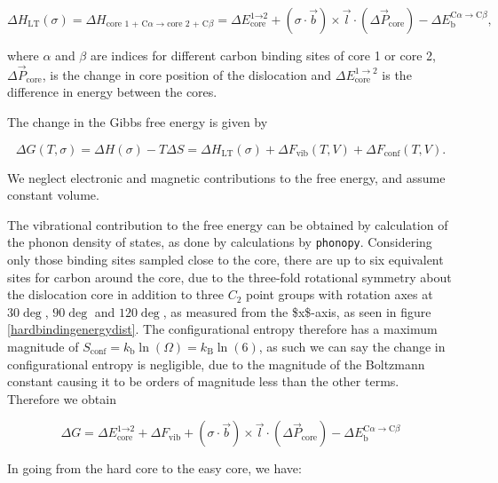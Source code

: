 \documentclass[a4paper,11pt]{article}
\numberwithin{equation}{chapter}
\numberwithin{listing}{chapter}
\begin{document}
    \begin{equation}
\Delta H_{\text{LT} }(\sigma) =      \Delta H_{ \text{core 1 + C}\alpha \rightarrow \text{core 2 + C}\beta }
       =  \Delta E_{\text{core}}^{\text{1} \rightarrow \text{2}}
	   + (\sigma \cdot \vec{b}) \times \vec{l}  \cdot ( \Delta\vec{P}_{\text{core}} )
       - \Delta E_{\text{b}}^{\text{C}\alpha \rightarrow \text{C}\beta},
    \end{equation}

where \(\alpha\) and \(\beta\) are indices for different carbon binding sites of
core 1 or core 2, \(\Delta \vec{P}_{\text{core} }\), is the change in core
position of the dislocation and \(\Delta E^{1\rightarrow 2}_{\text{core} }\)
is the difference in energy between the cores.

The change in the Gibbs free energy is given by

\[\Delta G(T,\sigma) = \Delta H(\sigma) -
    T\Delta S =
    \Delta H_{\text{LT}}(\sigma) + \Delta F_{\text{vib} }(T,V) + \Delta F_{\text{conf} }(T,V).\]

We neglect electronic and magnetic contributions to the free energy, and assume constant volume.

The vibrational contribution to the free energy can be obtained by
calculation of the phonon density of states, as done by
calculations by \texttt{phonopy}. Considering only those binding sites sampled
close to the core, there are up to six equivalent sites for carbon around
the core, due to the three-fold rotational symmetry about the dislocation
core in addition to three \(C_2\) point groups with rotation axes at \(30\deg\), \(90\deg\)
and \(120\deg\), as measured from the \$x\$-axis, as seen in figure
\ref{hardbindingenergydist}. The configurational entropy
therefore has a maximum magnitude of \(S_{\text{conf} } =
    k_{\text{b} }\ln (\Omega) = k_{\text{B}} \ln(6)\), as such we can say the
change in configurational entropy is negligible, due to the magnitude of the
Boltzmann constant causing it to be orders of magnitude less than the other terms. Therefore we obtain

\begin{equation}
 \Delta G
   =  \Delta E_{\text{core}}^{\text{1} \rightarrow \text{2}}
       + \Delta F_{\text{vib} }
       + (\sigma \cdot \vec{b}) \times \vec{l}  \cdot ( \Delta\vec{P}_{\text{core}} )
       - \Delta E_{\text{b}}^{\text{C}\alpha \rightarrow \text{C}\beta}
\end{equation}

In going from the hard core to the easy core, we have:
\end{document}
